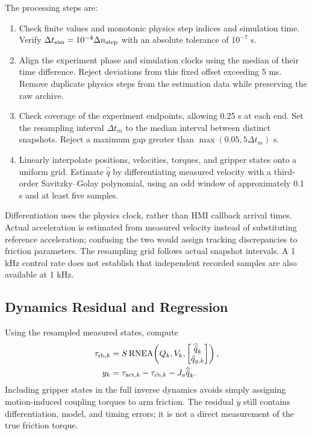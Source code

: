 \documentclass[11pt,a4paper]{report}
\newcommand{\RNEA}{\operatorname{RNEA}}
\begin{document}
The processing steps are:
\begin{enumerate}
 \item Check finite values and monotonic physics step indices and simulation time. Verify
 $\Delta t_{\rm sim}=10^{-4}\Delta n_{\rm step}$ with an absolute tolerance of $10^{-7}$ s.
 \item Align the experiment phase and simulation clocks using the median of their time difference. Reject deviations from this fixed offset exceeding 5 ms. Remove duplicate physics steps from the estimation data while preserving the raw archive.
 \item Check coverage of the experiment endpoints, allowing 0.25 s at each end. Set the resampling interval $\Delta t_m$ to the median interval between distinct snapshots. Reject a maximum gap greater than $\max(0.05,5\Delta t_m)$ s.
 \item Linearly interpolate positions, velocities, torques, and gripper states onto a uniform grid. Estimate $\widehat{\ddot q}$ by differentiating measured velocity with a third-order Savitzky--Golay polynomial, using an odd window of approximately 0.1 s and at least five samples.
\end{enumerate}
Differentiation uses the physics clock, rather than HMI callback arrival times. Actual acceleration is estimated from measured velocity instead of substituting reference acceleration; confusing the two would assign tracking discrepancies to friction parameters. The resampling grid follows actual snapshot intervals. A 1 kHz control rate does not establish that independent recorded samples are also available at 1 kHz.

\subsection{Dynamics Residual and Regression}
Using the resampled measured states, compute
\begin{align}
 \tau_{{\rm rb},k}&=S\RNEA\!\left(Q_k,V_k,
 \begin{bmatrix}\widehat{\ddot q}_k\\\ddot q_{g,k}\end{bmatrix}\right),\\
 y_k&=\tau_{{\rm act},k}-\tau_{{\rm rb},k}-J_a\widehat{\ddot q}_k.
 \label{eq:residual}
\end{align}
Including gripper states in the full inverse dynamics avoids simply assigning motion-induced coupling torques to arm friction. The residual $y$ still contains differentiation, model, and timing errors; it is not a direct measurement of the true friction torque.
\end{document}
